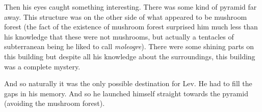 \documentclass[14p]{article}
\begin{document}
Then his eyes caught something interesting. There was some kind of pyramid far away. This structure was on the other side of what appeared to be mushroom forest (the fact of the existence of mushroom forest surprised him much less than his knowledge that these were not mushrooms, but actually a tentacles of subterranean being he liked to call \emph{moleogre}). There were some shining parts on this building but despite all his knowledge about the surroundings, this building was a complete mystery. 

And so naturally it was the only possible destination for Lev. He had to fill the gaps in his memory. And so he launched himself straight towards the pyramid (avoiding the mushroom forest).
\end{document}
